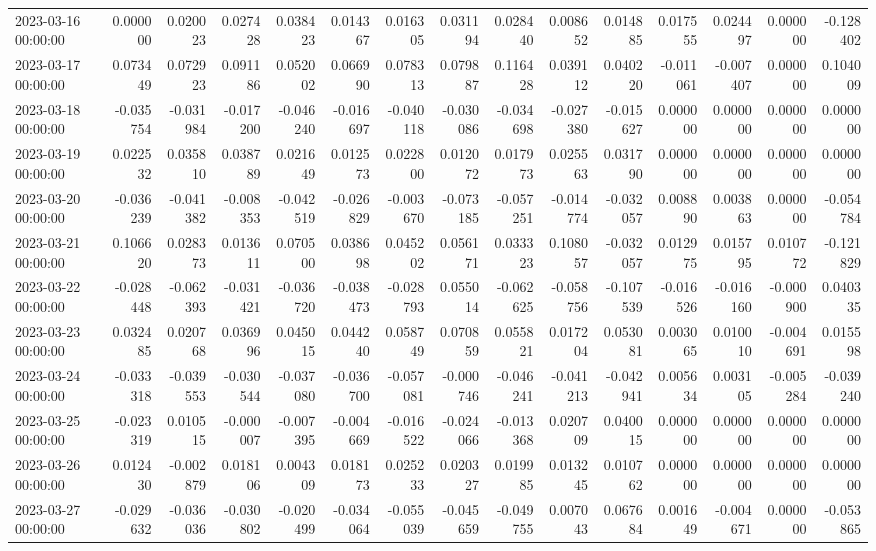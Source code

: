 \begin{tabular}{lrrrrrrrrrrrrrr}
2023-03-16 00:00:00 & 0.000000 & 0.020023 & 0.027428 & 0.038423 & 0.014367 & 0.016305 & 0.031194 & 0.028440 & 0.008652 & 0.014885 & 0.017555 & 0.024497 & 0.000000 & -0.128402 \\
2023-03-17 00:00:00 & 0.073449 & 0.072923 & 0.091186 & 0.052002 & 0.066990 & 0.078313 & 0.079887 & 0.116428 & 0.039112 & 0.040220 & -0.011061 & -0.007407 & 0.000000 & 0.104009 \\
2023-03-18 00:00:00 & -0.035754 & -0.031984 & -0.017200 & -0.046240 & -0.016697 & -0.040118 & -0.030086 & -0.034698 & -0.027380 & -0.015627 & 0.000000 & 0.000000 & 0.000000 & 0.000000 \\
2023-03-19 00:00:00 & 0.022532 & 0.035810 & 0.038789 & 0.021649 & 0.012573 & 0.022800 & 0.012072 & 0.017973 & 0.025563 & 0.031790 & 0.000000 & 0.000000 & 0.000000 & 0.000000 \\
2023-03-20 00:00:00 & -0.036239 & -0.041382 & -0.008353 & -0.042519 & -0.026829 & -0.003670 & -0.073185 & -0.057251 & -0.014774 & -0.032057 & 0.008890 & 0.003863 & 0.000000 & -0.054784 \\
2023-03-21 00:00:00 & 0.106620 & 0.028373 & 0.013611 & 0.070500 & 0.038698 & 0.045202 & 0.056171 & 0.033323 & 0.108057 & -0.032057 & 0.012975 & 0.015795 & 0.010772 & -0.121829 \\
2023-03-22 00:00:00 & -0.028448 & -0.062393 & -0.031421 & -0.036720 & -0.038473 & -0.028793 & 0.055014 & -0.062625 & -0.058756 & -0.107539 & -0.016526 & -0.016160 & -0.000900 & 0.040335 \\
2023-03-23 00:00:00 & 0.032485 & 0.020768 & 0.036996 & 0.045015 & 0.044240 & 0.058749 & 0.070859 & 0.055821 & 0.017204 & 0.053081 & 0.003065 & 0.010010 & -0.004691 & 0.015598 \\
2023-03-24 00:00:00 & -0.033318 & -0.039553 & -0.030544 & -0.037080 & -0.036700 & -0.057081 & -0.000746 & -0.046241 & -0.041213 & -0.042941 & 0.005634 & 0.003105 & -0.005284 & -0.039240 \\
2023-03-25 00:00:00 & -0.023319 & 0.010515 & -0.000007 & -0.007395 & -0.004669 & -0.016522 & -0.024066 & -0.013368 & 0.020709 & 0.040015 & 0.000000 & 0.000000 & 0.000000 & 0.000000 \\
2023-03-26 00:00:00 & 0.012430 & -0.002879 & 0.018106 & 0.004309 & 0.018173 & 0.025233 & 0.020327 & 0.019985 & 0.013245 & 0.010762 & 0.000000 & 0.000000 & 0.000000 & 0.000000 \\
2023-03-27 00:00:00 & -0.029632 & -0.036036 & -0.030802 & -0.020499 & -0.034064 & -0.055039 & -0.045659 & -0.049755 & 0.007043 & 0.067684 & 0.001649 & -0.004671 & 0.000000 & -0.053865 \\

\end{tabular}
